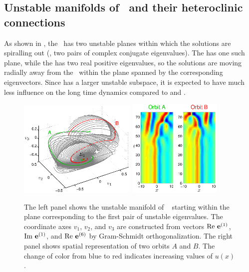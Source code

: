 \subsection{Unstable manifolds of \eqva\ and their heteroclinic
            connections}
\label{sec:unstMnflds}

As shown in ,
the  \eqv\ has two unstable
planes within which the solutions are spiralling out (\ie, two
pairs of complex conjugate eigenvalues).  The  has one such plane,
while the  has two real positive eigenvalues, so the solutions are
moving radially away from the \eqv\ within the plane spanned
by the corresponding eigenvectors.  Since  has
a larger unstable subspace, it is expected to have much less influence on the
long time dynamics compared to  and .

\begin{figure}[t]
\begin{center}
\includegraphics[width=0.5\textwidth]{figs/ks22_E1_plane1_manifold_c.eps}
\includegraphics[width=0.4\textwidth]{figs/ks22_E1_plane1_orbits_c.eps}
\end{center}
\caption{
The left panel shows the unstable
manifold of \eqv\  starting within the plane
corresponding to the first pair of unstable eigenvalues. The
coordinate axes $v_1$, $v_2$, and $v_3$ are constructed from vectors
${\rm Re\,} \,{\mathbf e}^{(1)}$, ${\rm Im\,} \,{\mathbf e}^{(1)}$,
and ${\rm Re\,} \,{\mathbf e}^{(6)}$
by Gram-Schmidt orthogonalization.
The right panel shows spatial representation of two orbits $A$ and $B$.
The change of color from blue to red indicates increasing values of
$u(x)$.
}
\label{f:KS22E1man1}
\end{figure}

